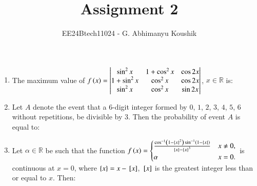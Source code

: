 \documentclass[journal,12pt,onecolumn]{IEEEtran}
\theoremstyle{remark}
\begin{document}
\title{Assignment 2}
\author{EE24Btech11024 - G. Abhimanyu Koushik}
\maketitle
\renewcommand{\thefigure}{\theenumi}
\renewcommand{\thetable}{\theenumi}
\begin{enumerate}

\item The maximum value of $f\left(x\right) = \begin{vmatrix}\sin^{2}x &1+\cos^{2}x & \cos 2x\\1+\sin^{2}x & \cos^{2}x & \cos 2x\\\sin^{2}x & \cos^{2}x & \sin 2x\end{vmatrix}$, $x \in \mathbb{R}$ is:

\hfill{}
\begin{enumerate}
\end{enumerate}

\item Let $A$ denote the event that a $6$-digit integer formed by $0$, $1$, $2$, $3$, $4$, $5$, $6$ without repetitions, be divisible by $3$. Then the probability of event $A$ is equal to:

\hfill{}
\begin{enumerate}
\end{enumerate}

\item Let $\alpha \in \mathbb{R}$ be such that the function $f\left(x\right) = \begin{cases} \frac{\cos^{-1}\left(1-\left\{x\right\}^2\right)\sin^{-1}\left(1-\left\{x\right\}\right)}{\left\{x\right\}-\left\{x\right\}^3} & x\neq 0, \\\alpha & x=0 .\end{cases}$ is continuous at $x=0$, where $\left\{x\right\}=x-{}\left[x\right]$, ${}\left[x\right]$ is the greatest integer less than or equal to $x$. Then:


\end{enumerate}
\end{document}
